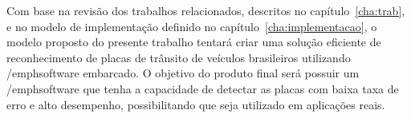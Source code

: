 Com base na revisão dos trabalhos relacionados, descritos no capítulo~\ref{cha:trab},
e no modelo de implementação definido no capítulo~\ref{cha:implementacao}, o modelo proposto
do presente trabalho tentará criar uma solução eficiente de reconhecimento de placas de trânsito
de veículos brasileiros utilizando /emph{software} embarcado. O objetivo do produto final será
possuir um /emph{software} que tenha a capacidade de detectar as placas com baixa taxa de erro
e alto desempenho, possibilitando que seja utilizado em aplicações reais.

